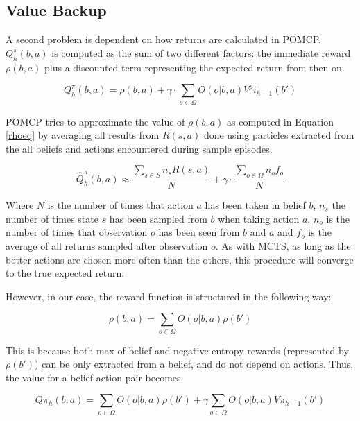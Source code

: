 %

\subsection{Value Backup}

A second problem is dependent on how returns are calculated in POMCP. $Q^\pi_h(b,a)$ is computed as the
sum of two different factors: the immediate reward $\rho(b,a)$ plus a discounted term representing
the expected return from then on.

\[ Q^\pi_h(b,a) = \rho(b,a) + \gamma \cdot \sum_{o\in \Omega} O(o|b,a) V^pi_{h-1}(b') \]

POMCP tries to approximate the value of $\rho(b,a)$ as computed in Equation \ref{rhoeq} by averaging
all results from $R(s,a)$ done using particles extracted from the all beliefs and actions
encountered during sample episodes.

\[ \hat{Q}^\pi_h(b,a) \approx \frac{\sum_{s \in S} n_s R(s,a)}{N} + \gamma \cdot \frac{\sum_{o\in \Omega} n_o f_o}{N} \]

Where $N$ is the number of times that action $a$ has been taken in belief $b$, $n_s$ the number of
times state $s$ has been sampled from $b$ when taking action $a$, $n_o$ is the number of times that
observation $o$ has been seen from $b$ and $a$ and $f_o$ is the average of all returns sampled after
observation $o$. As with MCTS, as long as the better actions are chosen more often than the others,
this procedure will converge to the true expected return.

However, in our case, the reward function is structured in the following way:

\[ \rho(b,a) = \sum_{o\in \Omega} O(o | b, a) \rho(b') \]

This is because both max of belief and negative entropy rewards (represented by $\rho(b')$) can be
only extracted from a belief, and do not depend on actions. Thus, the value for a belief-action pair
becomes:

\[ Q\pi_h(b,a) = \sum_{o\in \Omega} O(o | b,a) \rho(b') + \gamma\sum_{o\in\Omega} O(o|b,a) V\pi_{h-1}(b') \]

